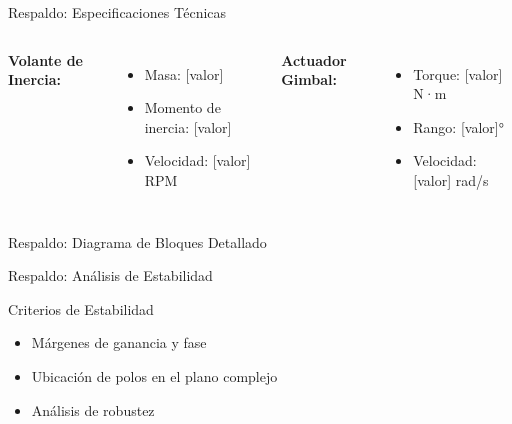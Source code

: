 \documentclass[10pt,xcolor={dvipsnames}]{beamer}
\begin{document}
\begin{frame}{Respaldo: Especificaciones Técnicas}
\begin{center}
\end{center}

\vspace{0.3cm}
\begin{columns}
\textbf{Volante de Inercia:}
\begin{itemize}
    \item Masa: [valor]
    \item Momento de inercia: [valor]
    \item Velocidad: [valor] RPM
\end{itemize}

\textbf{Actuador Gimbal:}
\begin{itemize}
    \item Torque: [valor] N·m
    \item Rango: [valor]°
    \item Velocidad: [valor] rad/s
\end{itemize}
\end{columns}
\end{frame}

\begin{frame}{Respaldo: Diagrama de Bloques Detallado}
\begin{center}
\end{center}
\end{frame}

\begin{frame}{Respaldo: Análisis de Estabilidad}
\begin{center}
\end{center}

\vspace{0.3cm}
\begin{block}{Criterios de Estabilidad}
\begin{itemize}
    \item Márgenes de ganancia y fase
    \item Ubicación de polos en el plano complejo
    \item Análisis de robustez
\end{itemize}
\end{block}
\end{frame}
\end{document}
